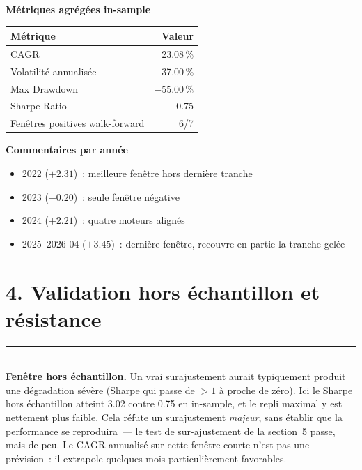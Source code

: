 \documentclass[11pt, a4paper]{scrartcl}
\begin{document}
\begin{minipage}{0.55\textwidth}
\small
\textbf{Métriques agrégées in-sample} \\[0.3em]
\begin{tabular}{@{}lr@{}}
\toprule
Métrique & Valeur \\
\midrule
CAGR & 23.08\,\% \\
Volatilité annualisée & 37.00\,\% \\
Max Drawdown & $-55.00\,\%$ \\
Sharpe Ratio & 0.75 \\
Fenêtres positives walk-forward & 6/7 \\
\bottomrule
\end{tabular}
\end{minipage}
\begin{minipage}{0.45\textwidth}
\small
\textbf{Commentaires par année} \\[0.3em]
\begin{itemize}[leftmargin=0.8em]
\item 2022 ($+2.31$)~: meilleure fenêtre hors dernière tranche
\item 2023 ($-0.20$)~: seule fenêtre négative
\item 2024 ($+2.21$)~: quatre moteurs alignés
\item 2025--2026-04 ($+3.45$)~: dernière fenêtre, recouvre en partie la tranche gelée
\end{itemize}
\end{minipage}




\section*{4. Validation hors échantillon et résistance}
\vspace{-0.4em}
{\color{accent}\rule{\linewidth}{1.0pt}}\\[0.4em]

\textbf{Fenêtre hors échantillon.} Un vrai surajustement aurait typiquement produit
une dégradation sévère (Sharpe qui passe de $>1$ à proche de zéro). Ici le Sharpe hors
échantillon atteint 3.02 contre 0.75 en in-sample, et le repli
maximal y est nettement plus faible. Cela réfute un surajustement \emph{majeur}, sans
établir que la performance se reproduira~--- le test de sur-ajustement de la section~5
passe, mais de peu. Le CAGR annualisé sur cette fenêtre courte n'est pas une prévision~: il
extrapole quelques mois particulièrement favorables.
\end{document}
